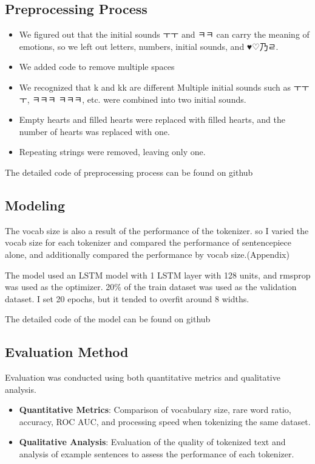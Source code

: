 \documentclass{article}
\begin{document}
\subsection{Preprocessing Process}

\begin{itemize}
\item We figured out that the initial sounds ㅜㅜ and ㅋㅋ can carry the meaning of emotions, so we left out letters, numbers, initial sounds, and ♥♡乃ㄹ.
\item We added code to remove multiple spaces
\item We recognized that k and kk are different Multiple initial sounds such as ㅜㅜㅜ, ㅋㅋㅋ ㅋㅋㅋ, etc. were combined into two initial sounds.
\item Empty hearts and filled hearts were replaced with filled hearts, and the number of hearts was replaced with one.
\item Repeating strings were removed, leaving only one.
\end{itemize}
The detailed code of preprocessing process can be found on github


\subsection{Modeling}
The vocab size is also a result of the performance of the tokenizer. so I varied the vocab size for each tokenizer and compared the performance of sentencepiece alone, and additionally compared the performance by vocab size.(Appendix)

The model used an LSTM model with 1 LSTM layer with 128 units, and rmsprop was used as the optimizer.
20\% of the train dataset was used as the validation dataset.
I set 20 epochs, but it tended to overfit around 8 widths.

The detailed code of the model can be found on github

\subsection{Evaluation Method}

Evaluation was conducted using both quantitative metrics and qualitative analysis.

\begin{itemize}
    \item \textbf{Quantitative Metrics}: Comparison of vocabulary size, rare word ratio, accuracy, ROC AUC, and processing speed when tokenizing the same dataset.
    \item \textbf{Qualitative Analysis}: Evaluation of the quality of tokenized text and analysis of example sentences to assess the performance of each tokenizer.
\end{itemize}
\end{document}
